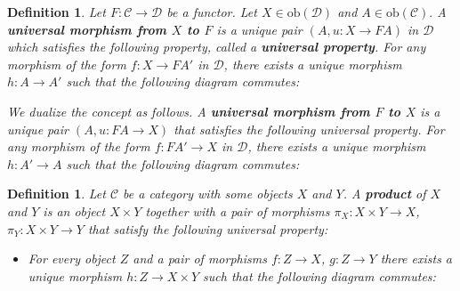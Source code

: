 \documentclass[11pt]{report}
\newcommand{\mcC}{\mathcal{C}}
\newcommand{\mcD}{\mathcal{D}}
\newcommand{\ob}{\text{ob}}
\newtheorem{defn}[thm]{Definition} %
\begin{document}
\begin{defn}
  Let $F: \mcC \to \mcD$ be a functor. Let $X \in \ob(\mcD)$ and $A \in \ob(\mcC).$ A \textbf{universal morphism from $X$ to $F$} is a unique pair
  $(A, u: X \to FA)$ in $\mcD$ which satisfies the following property, called a \textbf{universal property}.
  For any morphism of the form $f: X \to FA'$ in $\mcD$, there exists a unique morphism $h: A \to A'$ such that the following diagram commutes:
  \begin{center}
  \end{center}
  We dualize the concept as follows. A \textbf{universal morphism from $F$ to $X$} is a unique pair $(A, u: FA \to X)$ that satisfies the following universal property. For any morphism of the form
  $f : FA' \to X$ in $\mcD$, there exists a unique morphism $h: A' \to A$ such that the following diagram commutes:
  \begin{center}
  \end{center}

\end{defn}

\begin{defn}
  Let $\mcC$ be a category with some objects $X$ and $Y$. A \textbf{product} of $X$ and $Y$ is an object $X \times Y$ together with a pair of morphisms
  $\pi_X: X \times Y\to X$, $\pi_Y: X \times Y\to Y$ that satisfy the following universal property:
  \begin{itemize}
  \item For every object $Z$ and a pair of morphisms $f: Z \to X$, $g: Z \to Y$ there exists a unique morphism $h: Z \to X \times Y$ such that
    the following diagram commutes:
    \begin{center}
    \end{center}
  \end{itemize}
\end{defn}
\end{document}
